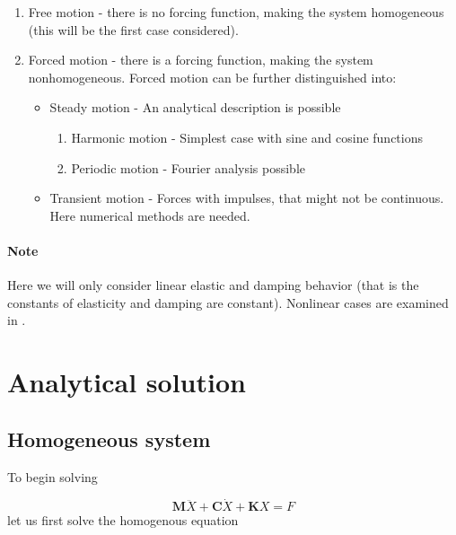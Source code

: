 \documentclass{article}
\begin{document}
				\begin{enumerate}
  					\item Free motion - there is no forcing function, making the system homogeneous (this will be the first case considered).
  					\item Forced motion - there is a forcing function, making the system nonhomogeneous. Forced motion can be further distinguished into:
					\begin{itemize}
						\item Steady motion - An analytical description is possible
							\begin{enumerate}	
								\item Harmonic motion - Simplest case with sine and cosine functions
	 							\item Periodic motion - Fourier analysis possible
							\end{enumerate}
	 					\item Transient motion - Forces with impulses, that might not be continuous. Here numerical methods are needed.
					\end{itemize}
				\end{enumerate}

				\paragraph{Note} Here we will only consider linear elastic and damping behavior (that is the constants of elasticity and damping are constant). Nonlinear cases are examined in \cite{Hughes}.



	\section{Analytical solution}

		\subsection{Homogeneous system}

			To begin solving
				
				\begin{equation*}
					\textbf{M}\ddot{X}+\textbf{C}\dot{X}+\textbf{K}X = F
				\end{equation*}
let us first solve the homogenous equation
\end{document}
